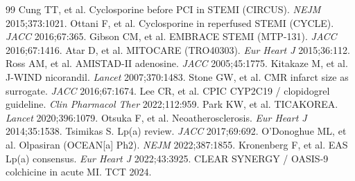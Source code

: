 \documentclass[11pt]{article}
\begin{document}
\begin{thebibliography}{99}
 Cung TT, et al. Cyclosporine before PCI in STEMI (CIRCUS). \emph{NEJM} 2015;373:1021.
 Ottani F, et al. Cyclosporine in reperfused STEMI (CYCLE). \emph{JACC} 2016;67:365.
 Gibson CM, et al. EMBRACE STEMI (MTP-131). \emph{JACC} 2016;67:1416.
 Atar D, et al. MITOCARE (TRO40303). \emph{Eur Heart J} 2015;36:112.
 Ross AM, et al. AMISTAD-II adenosine. \emph{JACC} 2005;45:1775.
 Kitakaze M, et al. J-WIND nicorandil. \emph{Lancet} 2007;370:1483.
 Stone GW, et al. CMR infarct size as surrogate. \emph{JACC} 2016;67:1674.
 Lee CR, et al. CPIC CYP2C19 / clopidogrel guideline. \emph{Clin Pharmacol Ther} 2022;112:959.
 Park KW, et al. TICAKOREA. \emph{Lancet} 2020;396:1079.
 Otsuka F, et al. Neoatherosclerosis. \emph{Eur Heart J} 2014;35:1538.
 Tsimikas S. Lp(a) review. \emph{JACC} 2017;69:692.
 O'Donoghue ML, et al. Olpasiran (OCEAN[a] Ph2). \emph{NEJM} 2022;387:1855.
 Kronenberg F, et al. EAS Lp(a) consensus. \emph{Eur Heart J} 2022;43:3925.
 CLEAR SYNERGY / OASIS-9 colchicine in acute MI. TCT 2024.
\end{thebibliography}
\end{document}
